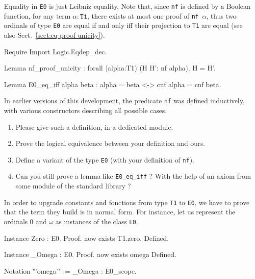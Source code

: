 Equality in \texttt{E0} is just Leibniz equality. Note that, since \texttt{nf} is
defined by a Boolean function, for  any term $\alpha:\texttt{T1}$, there exists at most one proof of \texttt{nf $\alpha$}, thus two ordinals of type \texttt{E0} are
equal if and only iff their projection to \texttt{T1} are equal (see also Sect.~\vref{sect:eq-proof-unicity}).



\begin{Coqsrc}
Require Import Logic.Eqdep_dec.

Lemma nf_proof_unicity :
  forall (alpha:T1) (H H': nf alpha), H = H'.

Lemma E0_eq_iff alpha beta : alpha = beta <-> cnf alpha = cnf beta.
\end{Coqsrc}

\begin{exercise}
In earlier versions of this development, the predicate \texttt{nf} was defined  inductively, with various constructors describing all possible cases.
\begin{enumerate}
\item Please give such a definition, in a dedicated module.
\item Prove the logical equivalence between your definition and ours.
\item Define a variant of the type \texttt{E0} (with your definition of \texttt{nf}).
\item Can you still prove a lemma like \texttt{E0\_eq\_iff} ? With the help of an axiom from some module of the standard library ?
\end{enumerate}
\end{exercise}


In order to  upgrade constants and fonctions from type \texttt{T1} to \texttt{E0}, we have to prove that 
the term they build is in normal form.
For instance, let us represent the ordinals $0$ and $\omega$ as instances of the class \texttt{E0}.

\label{sect:omega-T1}

\begin{Coqsrc}
Instance Zero : E0.
Proof.
  now exists T1.zero.
Defined.

Instance _Omega : E0.
Proof.  now exists omega%
Defined.

Notation "'omega'"  := _Omega : E0_scope.
\end{Coqsrc}



